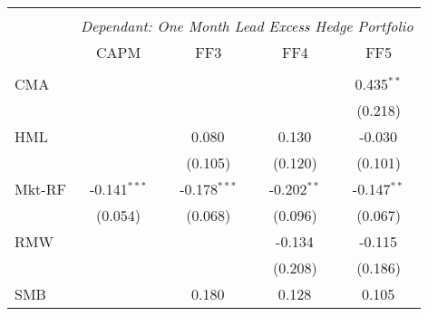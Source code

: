 \begin{table}[H] \centering
  \begin{tabular}{@{\extracolsep{5pt}}lcccc}
    \\[-1.8ex]\hline
    \hline                                                                                                                                                       \\[-1.8ex]
                      & \multicolumn{4}{c}{\textit{Dependant: One Month Lead Excess Hedge Portfolio}} \
    \cr \cline{2-5}
    \\[-1.8ex] & CAPM & FF3 & FF4 & FF5 \\
    \hline                                                                                                                                                       \\[-1.8ex]
    CMA               &                                                                                  &                   &                   & 0.435$^{**}$  \\
                      &                                                                                  &                   &                   & (0.218)       \\
    HML               &                                                                                  & 0.080$^{}$        & 0.130$^{}$        & -0.030$^{}$   \\
                      &                                                                                  & (0.105)           & (0.120)           & (0.101)       \\
    Mkt-RF            & -0.141$^{***}$                                                                   & -0.178$^{***}$    & -0.202$^{**}$     & -0.147$^{**}$ \\
                      & (0.054)                                                                          & (0.068)           & (0.096)           & (0.067)       \\
    RMW               &                                                                                  &                   & -0.134$^{}$       & -0.115$^{}$   \\
                      &                                                                                  &                   & (0.208)           & (0.186)       \\
    SMB               &                                                                                  & 0.180$^{}$        & 0.128$^{}$        & 0.105$^{}$    \\

\end{tabular}
\end{table}
